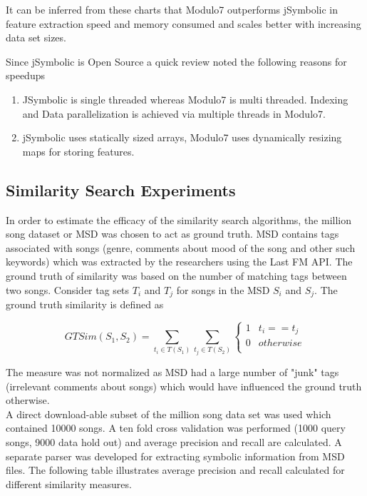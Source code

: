 \documentclass{article}
\begin{document}
\noindent It can be inferred from these charts that Modulo7 outperforms jSymbolic in feature extraction speed and memory consumed and scales better with increasing data set sizes. 

\noindent Since jSymbolic is Open Source a quick review noted the following reasons for speedups

\begin{enumerate}
\item JSymbolic is single threaded whereas Modulo7 is multi threaded. Indexing and Data parallelization is achieved via multiple threads in Modulo7.  
\item jSymbolic uses statically sized arrays, Modulo7 uses dynamically resizing maps for storing features.
\end{enumerate}

\subsection{Similarity Search Experiments}

\noindent In order to estimate the efficacy of the similarity search algorithms, the million song dataset or MSD \cite{msd} was chosen to act as ground truth. MSD contains tags associated with songs (genre, comments about mood of the song and other such keywords) which was extracted by the researchers using the Last FM API. The ground truth of similarity was based on the number of matching tags between two songs. Consider tag sets $T_i$ and $T_j$ for songs in the MSD $S_i$ and $S_j$. The ground truth similarity is defined as 

\begin{equation} \label{taghitrate}
GTSim(S_1, S_2) = \sum_{t_i \in T(S_1)} \sum_{t_j \in T(S_2)} \begin{cases} 
      1 & t_i == t_j \\
      0 & otherwise \\  \end{cases}
\end{equation}

\noindent The measure was not normalized as MSD had a large number of "junk" tags (irrelevant comments about songs) which would have influenced the ground truth otherwise. \\

\noindent A direct download-able subset of the million song data set was used which contained 10000 songs. A ten fold cross validation was performed (1000 query songs, 9000 data hold out) and average precision and recall are calculated. A separate parser was developed for extracting symbolic information from MSD files. The following table illustrates average precision and recall calculated for different similarity measures. 
\end{document}
